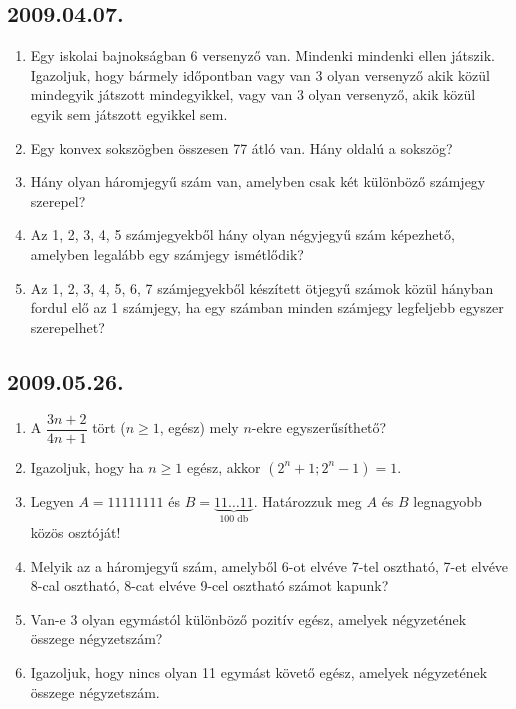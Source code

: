 \documentclass{article}
\begin{document}
\subsection*{2009.04.07.}
\begin{enumerate}
\item Egy iskolai bajnokságban 6 versenyző van. Mindenki mindenki ellen játszik.
Igazoljuk, hogy bármely időpontban vagy van 3 olyan versenyző akik közül mindegyik játszott mindegyikkel, vagy van 3 olyan versenyző, akik közül egyik sem játszott egyikkel sem.
\item Egy konvex sokszögben összesen 77 átló van. Hány oldalú a sokszög?
\item Hány olyan háromjegyű szám van, amelyben csak két különböző számjegy szerepel?
\item Az 1, 2, 3, 4, 5 számjegyekből hány olyan négyjegyű szám képezhető, amelyben legalább egy számjegy ismétlődik?
\item Az 1, 2, 3, 4, 5, 6, 7 számjegyekből készített ötjegyű számok közül hányban fordul elő az 1 számjegy, ha egy számban minden számjegy legfeljebb egyszer szerepelhet?
\end{enumerate}

\subsection*{2009.05.26.}
\begin{enumerate}
\item A $\dfrac{3n+2}{4n+1}$ tört ($n\ge 1$, egész) mely $n$-ekre egyszerűsíthető?
\item Igazoljuk, hogy ha $n\ge 1$ egész, akkor $\left(2^n+1; 2^n-1\right)=1$.
\item Legyen $A=11111111$ és $B=\underbrace{11\ldots 11}_{100\text{~db}}$. Határozzuk meg $A$ és $B$ legnagyobb közös osztóját!
\item Melyik az a háromjegyű szám, amelyből 6-ot elvéve 7-tel osztható, 7-et elvéve 8-cal osztható, 8-cat elvéve 9-cel osztható számot kapunk?
\item Van-e 3 olyan egymástól különböző pozitív egész, amelyek négyzetének összege négyzetszám?
\item Igazoljuk, hogy nincs olyan 11 egymást követő egész, amelyek négyzetének összege négyzetszám.
\end{enumerate}
\end{document}
